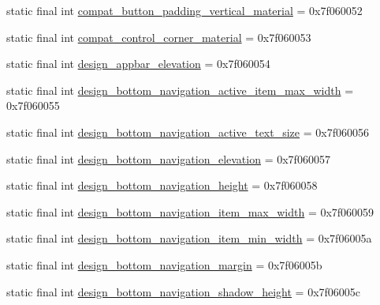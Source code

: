 \begin{DoxyCompactItemize}
\item 
static final int \mbox{\hyperlink{classandroid_1_1support_1_1design_1_1R_1_1dimen_aba24eef96a56ca19c8a675592fcf63ee}{compat\+\_\+button\+\_\+padding\+\_\+vertical\+\_\+material}} = 0x7f060052
\item 
static final int \mbox{\hyperlink{classandroid_1_1support_1_1design_1_1R_1_1dimen_ac6b7b07c02b4d17dc85b13f06920288f}{compat\+\_\+control\+\_\+corner\+\_\+material}} = 0x7f060053
\item 
static final int \mbox{\hyperlink{classandroid_1_1support_1_1design_1_1R_1_1dimen_ad02702f8e442d5ce2161992d960183a4}{design\+\_\+appbar\+\_\+elevation}} = 0x7f060054
\item 
static final int \mbox{\hyperlink{classandroid_1_1support_1_1design_1_1R_1_1dimen_ac2c5edeb19c307d2cd85bc943a26be7b}{design\+\_\+bottom\+\_\+navigation\+\_\+active\+\_\+item\+\_\+max\+\_\+width}} = 0x7f060055
\item 
static final int \mbox{\hyperlink{classandroid_1_1support_1_1design_1_1R_1_1dimen_a3faeaf48adf0ce34f4311f8de6cca331}{design\+\_\+bottom\+\_\+navigation\+\_\+active\+\_\+text\+\_\+size}} = 0x7f060056
\item 
static final int \mbox{\hyperlink{classandroid_1_1support_1_1design_1_1R_1_1dimen_ab72af6173c7d824d7c1f99f8dc8a37a6}{design\+\_\+bottom\+\_\+navigation\+\_\+elevation}} = 0x7f060057
\item 
static final int \mbox{\hyperlink{classandroid_1_1support_1_1design_1_1R_1_1dimen_a3d6aa9839e81ba7fe327f28c2a590f28}{design\+\_\+bottom\+\_\+navigation\+\_\+height}} = 0x7f060058
\item 
static final int \mbox{\hyperlink{classandroid_1_1support_1_1design_1_1R_1_1dimen_aca1afc86a6cd7a315e45f3dbfe6bf379}{design\+\_\+bottom\+\_\+navigation\+\_\+item\+\_\+max\+\_\+width}} = 0x7f060059
\item 
static final int \mbox{\hyperlink{classandroid_1_1support_1_1design_1_1R_1_1dimen_ad927a1758c4919be79e3897a1f5c56db}{design\+\_\+bottom\+\_\+navigation\+\_\+item\+\_\+min\+\_\+width}} = 0x7f06005a
\item 
static final int \mbox{\hyperlink{classandroid_1_1support_1_1design_1_1R_1_1dimen_a72a0b5e2c6d824f22e1b3bccb7ab495f}{design\+\_\+bottom\+\_\+navigation\+\_\+margin}} = 0x7f06005b
\item 
static final int \mbox{\hyperlink{classandroid_1_1support_1_1design_1_1R_1_1dimen_a75128c578ffc4c320a46382a28fa3501}{design\+\_\+bottom\+\_\+navigation\+\_\+shadow\+\_\+height}} = 0x7f06005c
\item 

\end{DoxyCompactItemize}
